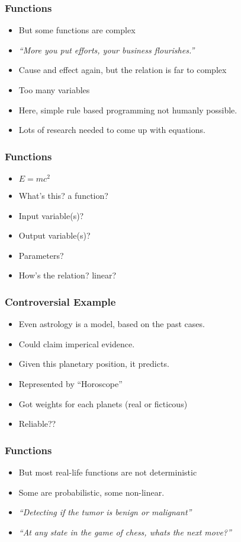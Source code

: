 \begin{frame}[fragile]\frametitle{Functions}
\begin{itemize}
\item But some functions are complex
\item {\em ``More you put efforts, your business flourishes.''}
\item Cause and effect again, but the relation is far to complex
\item Too many variables
\item Here, simple rule based programming not humanly possible.
\item Lots of research needed to come up with equations.
\end{itemize}
\end{frame}

\begin{frame}[fragile]\frametitle{Functions}
\begin{itemize}
\item $E = mc^2$
\item What's this? a function?
\item Input variable(s)?
\item Output variable(s)?
\item Parameters?
\item How's the relation? linear?
\end{itemize}
\end{frame}

\begin{frame}[fragile]\frametitle{Controversial Example}
\begin{itemize}
\item Even astrology is a model, based on the past cases.
\item Could claim imperical evidence. 
\item Given this planetary position, it predicts.
\item Represented by ``Horoscope''
\item Got weights for each planets (real or ficticous)
\item Reliable??
\end{itemize}
\end{frame}


\begin{frame}[fragile]\frametitle{Functions}
\begin{itemize}
\item But most real-life functions are not deterministic
\item Some are probabilistic, some non-linear.
\item {\em ``Detecting if the tumor is benign or malignant''}
\item {\em ``At any state in the game of chess, whats the next move?''}
\end{itemize}
\end{frame}

